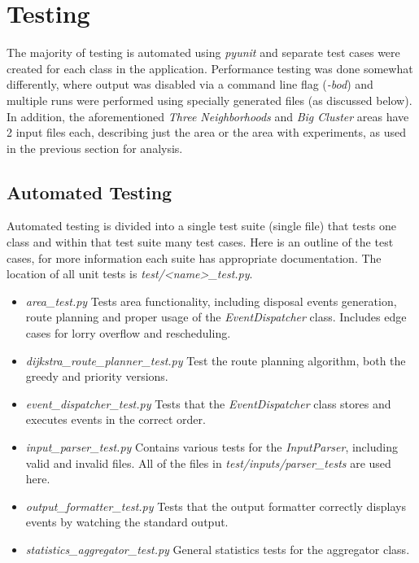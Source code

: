 \documentclass{article}
\begin{document}
		\section{Testing}
		The majority of testing is automated using \textit{pyunit} and separate test cases were created for each class in the application.
		Performance testing was done somewhat differently, where output was disabled via a command line flag (\textit{-bod}) and
		multiple runs were performed using specially generated files (as discussed below). In addition, the aforementioned \textit{Three Neighborhoods}
		and \textit{Big Cluster} areas have 2 input files each, describing just the area or the area with experiments, as used in the 
		previous section for analysis.

		\subsection{Automated Testing}
		Automated testing is divided into a single test suite (single file) that tests one class and within that test suite many test
		cases. Here is an outline of the test cases, for more information each suite has appropriate documentation. The location of all
		unit tests is \textit{test/\textless name\textgreater\_test.py}.

		\begin{itemize}
			\item \textit{area\_test.py} \- Tests area functionality, including disposal events generation, route planning
				and proper usage of the \textit{EventDispatcher} class. Includes edge cases for lorry overflow and rescheduling.
			
			\item \textit{dijkstra\_route\_planner\_test.py} \- Test the route planning algorithm, both the greedy and priority versions.
			
			\item \textit{event\_dispatcher\_test.py} \- Tests that the \textit{EventDispatcher} class stores and executes events
				in the correct order.

			\item \textit{input\_parser\_test.py} \- Contains various tests for the \textit{InputParser}, including valid and invalid
				files. All of the files in \textit{test/inputs/parser\_tests} are used here.

			\item \textit{output\_formatter\_test.py} \- Tests that the output formatter correctly displays events by watching the standard
				output.

			\item \textit{statistics\_aggregator\_test.py} \- General statistics tests for the aggregator class.
		\end{itemize}
\end{document}
